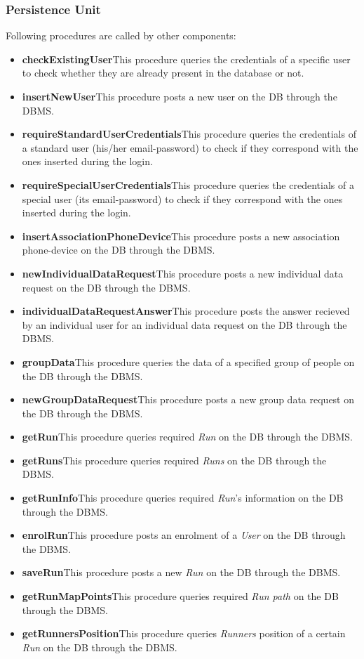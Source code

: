 \subsubsection{Persistence Unit}
Following procedures are called by other components:
\begin{itemize}
  \item \textbf{checkExistingUser}\quad This procedure queries the credentials of a specific user to check whether they are already present in the database or not.
  \item \textbf{insertNewUser}\quad This procedure posts a new user on the DB through the DBMS.
  \item \textbf{requireStandardUserCredentials}\quad This procedure queries the credentials of a standard user (his/her email-password) to check if they correspond with the ones inserted during the login.
  \item \textbf{requireSpecialUserCredentials}\quad This procedure queries the credentials of a special user (its email-password) to check if they correspond with the ones inserted during the login.
  \item \textbf{insertAssociationPhoneDevice}\quad This procedure posts a new association phone-device on the DB through the DBMS.
  \item \textbf{newIndividualDataRequest}\quad This procedure posts a new individual data request on the DB through the DBMS.
  \item \textbf{individualDataRequestAnswer}\quad This procedure posts the answer recieved by an individual user for an individual data request on the DB through the DBMS.
  \item \textbf{groupData}\quad This procedure queries the data of a specified group of people on the DB through the DBMS.
  \item \textbf{newGroupDataRequest}\quad This procedure posts a new group data request on the DB through the DBMS.
  \item \textbf{getRun}\quad This procedure queries required \textit{Run} on the DB through the DBMS.
  \item \textbf{getRuns}\quad This procedure queries required \textit{Runs} on the DB through the DBMS.
  \item \textbf{getRunInfo}\quad This procedure queries required \textit{Run}'s information on the DB through the DBMS.
  \item \textbf{enrolRun}\quad This procedure posts an enrolment of a \textit{User} on the DB through the DBMS.
  \item \textbf{saveRun}\quad This procedure posts a new \textit{Run} on the DB through the DBMS.
  \item \textbf{getRunMapPoints}\quad This procedure queries required \textit{Run path} on the DB through the DBMS.
  \item \textbf{getRunnersPosition}\quad This procedure queries \textit{Runners} position of a certain \textit{Run }on the DB through the DBMS.
\end{itemize}

